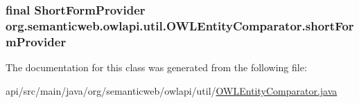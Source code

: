 \hypertarget{classorg_1_1semanticweb_1_1owlapi_1_1util_1_1_o_w_l_entity_comparator_add68940b53f7201f040c1acec502c179}{
\subsubsection[{short\-Form\-Provider}]{\setlength{\rightskip}{0pt plus 5cm}final {\bf Short\-Form\-Provider} org.\-semanticweb.\-owlapi.\-util.\-O\-W\-L\-Entity\-Comparator.\-short\-Form\-Provider\hspace{0.3cm}{\ttfamily [private]}}}\label{classorg_1_1semanticweb_1_1owlapi_1_1util_1_1_o_w_l_entity_comparator_add68940b53f7201f040c1acec502c179}


The documentation for this class was generated from the following file\-:\begin{DoxyCompactItemize}
\item 
api/src/main/java/org/semanticweb/owlapi/util/\hyperlink{_o_w_l_entity_comparator_8java}{O\-W\-L\-Entity\-Comparator.\-java}\end{DoxyCompactItemize}
